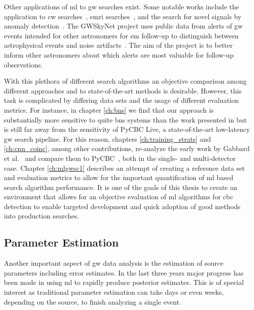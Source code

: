Other applications of \acrshort{ml} to \acrshort{gw} searches exist. Some notable works include the application to \acrshort{cw} searches~\cite{Dreissigacker:2019edy, Dreissigacker:2020xfr, Beheshtipour:2020zhb, Beheshtipour:2020nko}, \acrshort{emri} searches~\cite{Zhang:2022xuq}, and the search for novel signals by anomaly detection~\cite{Morawski:2021kxv, Moreno:2021fvp}. The GWSkyNet project uses public data from alerts of \acrshort{gw} events intended for other astronomers for \acrshort{em} follow-up to distinguish between astrophysical events and noise artifacts~\cite{Cabero:2020eik, Abbott:2021cuf}. The aim of the project is to better inform other astronomers about which alerts are most valuable for follow-up observations.

With this plethora of different search algorithms an objective comparison among different approaches and to state-of-the-art methods is desirable. However, this task is complicated by differing data sets and the usage of different evaluation metrics. For instance, in chapter \ref{ch:bns} we find that our approach is substantially more sensitive to quite \acrshort{bns} systems than the work presented in \cite{Krastev:2019koe} but is still far away from the sensitivity of PyCBC Live, a state-of-the-art low-latency \acrshort{gw} search pipeline. For this reason, chapters \ref{ch:training_strats} and \ref{ch:cnn_coinc}, among other contributions, re-analyze the early work by Gabbard et al.~\cite{Gabbard:2017lja} and compare them to PyCBC~\cite{Usman:2015kfa}, both in the single- and multi-detector case. Chapter \ref{ch:mlgwsc1} describes an attempt of creating a reference data set and evaluation metrics to allow for the important quantification of \acrshort{ml} based search algorithm performance. It is one of the goals of this thesis to create an environment that allows for an objective evaluation of \acrshort{ml} algorithms for \acrshort{cbc} detection to enable targeted development and quick adoption of good methods into production searches.

\subsection{Parameter Estimation}
Another important aspect of \acrshort{gw} data analysis is the estimation of source parameters including error estimates. In the last three years major progress has been made in using \acrshort{ml} to rapidly produce posterior estimates. This is of special interest as traditional parameter estimation can take days or even weeks, depending on the source, to finish analyzing a single event.

